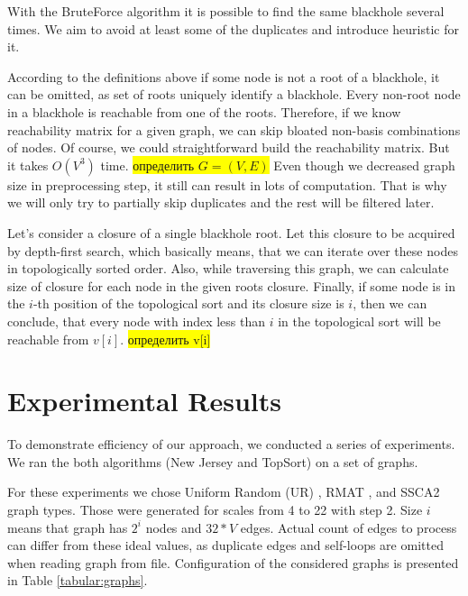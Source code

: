 \documentclass{svproc}
\newcommand{\FIXME}[1]{ %
	\colorbox{yellow}{#1}
}
\newcommand{\FIXME}[1]{ %
}
\begin{document}
With the BruteForce algorithm it is possible to find the same blackhole several times.
We aim to avoid at least some of the duplicates and introduce heuristic for it.

According to the definitions above if some node is not a root of a blackhole, it can be omitted, as set of roots uniquely identify a blackhole.
Every non-root node in a blackhole is reachable from one of the roots. Therefore, if we know reachability matrix for a given graph, we can skip bloated non-basis combinations of nodes.
Of course, we could straightforward build the reachability matrix. But it takes $O(V^3)$ time. \FIXME{определить $G=(V, E)$} Even though we decreased graph size in preprocessing step, it still can result in lots of computation. That is why we will only try to partially skip duplicates and the rest will be filtered later.

Let's consider a closure of a single blackhole root. Let this closure to be acquired by depth-first search, which basically means, that
we can iterate over these nodes in topologically sorted order. Also, while traversing this graph, we can calculate size of closure for each node
in the given roots closure. Finally, if some node is in the $i$-th position of the topological sort and its closure size is $i$, then we can 
conclude, that every node with index less than $i$ in the topological sort will be reachable from $v[i]$. \FIXME{определить v[i]}

%
\section{Experimental Results}
To demonstrate efficiency of our approach, we conducted a series of experiments. We ran the both algorithms (New Jersey and TopSort) on a 
set of graphs. 

For these experiments we chose Uniform Random (UR) \cite{random-uniform}, RMAT \cite{chakrabarti2004r},  and SSCA2 \cite{bader2005design} graph types. Those were generated for scales from 4 to 22
with step 2. Size $i$ means that graph has $2^i$ nodes and $32*V$ edges. Actual count of edges to process can differ from these ideal values, as duplicate edges and self-loops are omitted when reading graph from file. Configuration of the considered graphs is presented in Table \ref{tabular:graphs}.
\end{document}
